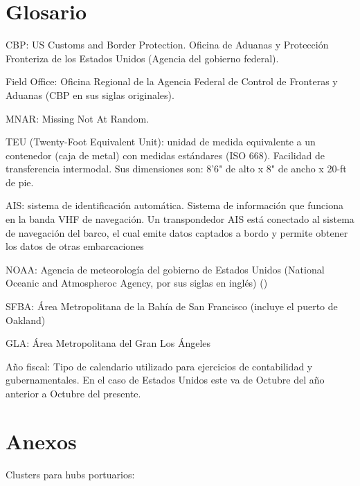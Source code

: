 \documentclass[12pt]{article}
\begin{document}
\newpage



\newpage
\section{Glosario}
\begin{description}
	\item CBP: US Customs and Border Protection. Oficina de Aduanas y Protección Fronteriza de los Estados Unidos (Agencia del gobierno federal).\cite{cbp_website}
	\item Field Office: Oficina Regional de la Agencia Federal de Control de Fronteras y Aduanas (CBP en sus siglas originales). \cite{cbp2025ports}
	\item MNAR: Missing Not At Random.
	\item TEU (Twenty-Foot Equivalent Unit): unidad de medida equivalente a un contenedor (caja de metal) con medidas estándares (ISO 668). Facilidad de transferencia intermodal. Sus dimensiones son: 8'6" de alto x 8" de ancho x 20-ft de pie.
	\item AIS: sistema de identificación automática. Sistema de información que funciona en la banda VHF de navegación. Un transpondedor AIS está conectado al sistema de navegación del barco, el cual emite datos captados a bordo y permite obtener los datos de otras embarcaciones \cite{nauticaprofesional2025ais} 
	\item NOAA: Agencia de meteorología del gobierno de Estados Unidos (National Oceanic and Atmospheroc Agency, por sus siglas en inglés) (\cite{NOAA_ScienceCouncil})
	\item SFBA: Área Metropolitana de la Bahía de San Francisco (incluye el puerto de Oakland)
	\item GLA: Área Metropolitana del Gran Los Ángeles
	\item Año fiscal: Tipo de calendario utilizado para ejercicios de contabilidad y gubernamentales. En el caso de Estados Unidos este va de Octubre del año anterior a Octubre del presente. \cite{federaltimes2022fiscalyear}
\end{description}

\newpage
\section{Anexos}
Clusters para hubs portuarios:
\end{document}
